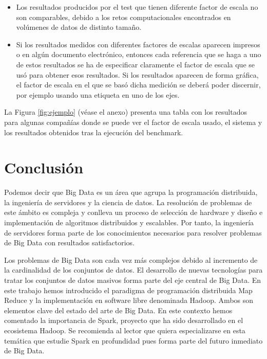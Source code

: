 \documentclass[10pt]{article}
\begin{document}
		\begin{itemize}
			\item Los resultados producidos por el test que tienen diferente factor de escala no son comparables, debido a los retos computacionales encontrados en volúmenes de datos de distinto tamaño.
			\item Si los resultados medidos con diferentes factores de escalas aparecen impresos o en algún documento electrónico, entonces cada referencia que se haga a uno de estos resultados se ha de especificar claramente el factor de escala que se usó para obtener esos resultados. Si los resultados aparecen de forma gráfica, el factor de escala en el que se basó dicha medición se deberá poder discernir, por ejemplo usando una etiqueta en uno de los ejes.
		\end{itemize}
		
		
		La Figura \ref{fig:ejemplo} (véase el anexo) presenta una tabla con los resultados para algunas compañías donde se puede ver el factor de escala usado, el sistema y los resultados obtenidos tras la ejecución del benchmark.


\section{Conclusión} \label{sec:conclusion}

	Podemos decir que Big Data es un área que agrupa la programación distribuida, la ingeniería de servidores y la ciencia de datos. La resolución de problemas de este ámbito es compleja y conlleva un proceso de selección de hardware y diseño e implementación de algoritmos distribuidos y escalables. Por tanto, la ingeniería de servidores forma parte de los conocimientos necesarios para resolver problemas de Big Data con resultados satisfactorios.
	
	Los problemas de Big Data son cada vez más complejos debido al incremento de la cardinalidad de los conjuntos de datos. El desarrollo de nuevas tecnologías para tratar los conjuntos de datos masivos forma parte del eje central de Big Data. En este trabajo hemos introducido el paradigma de programación distribuida Map Reduce y la implementación en software libre denominada Hadoop. Ambos son elementos clave del estado del arte de Big Data. En este contexto hemos comentado la importancia de Spark, proyecto que ha sido desarrollado en el ecosistema Hadoop. Se recomienda al lector que quiera especializarse en esta temática que estudie Spark en profundidad pues forma parte del futuro inmediato de Big Data.
	
\end{document}
